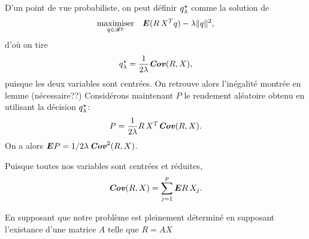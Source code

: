 D'un point de vue probabiliste, on peut définir $\qsh$ comme la solution de
\begin{equation}
  \maximizeEquation[q \in \Re^p]{\E(R\,X^Tq) - \lambda\|q\|^2,}
\end{equation}
d'où on tire
\begin{equation}
  q^\star_\lambda = \frac{1}{2\lambda}\Cov(R,X),
\end{equation}
puisque les deux variables sont centrées. On retrouve alors l'inégalité montrée en lemme
\cit (nécessaire??)
Considérons maintenant $P$ le rendement aléatoire obtenu en utilisant la décision $\qsh$:
\begin{equation}
  P = \frac{1}{2\lambda}R\,X^T\Cov(R,X).
\end{equation}
On a alors $\E P = 1/2\lambda\,\Cov^2(R,X)$.

Puisque toutes nos variables sont centrées et réduites,
\begin{equation}
  \Cov(R,X) = \sumj\E R\,X_j.
\end{equation}

En supposant que notre problème est pleinement déterminé en supposant l'existance d'une
matrice $A$ telle que $R = AX$








